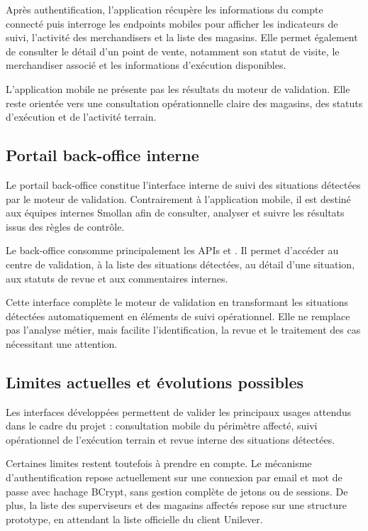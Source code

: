 Après authentification, l’application récupère les informations du compte connecté puis interroge les endpoints mobiles pour afficher les indicateurs de suivi, l’activité des merchandisers et la liste des magasins. Elle permet également de consulter le détail d’un point de vente, notamment son statut de visite, le merchandiser associé et les informations d’exécution disponibles.

L’application mobile ne présente pas les résultats du moteur de validation. Elle reste orientée vers une consultation opérationnelle claire des magasins, des statuts d’exécution et de l’activité terrain.

\subsection{Portail back-office interne}

Le portail back-office constitue l’interface interne de suivi des situations détectées par le moteur de validation. Contrairement à l’application mobile, il est destiné aux équipes internes Smollan afin de consulter, analyser et suivre les résultats issus des règles de contrôle.

Le back-office consomme principalement les APIs  et . Il permet d’accéder au centre de validation, à la liste des situations détectées, au détail d’une situation, aux statuts de revue et aux commentaires internes.

Cette interface complète le moteur de validation en transformant les situations détectées automatiquement en éléments de suivi opérationnel. Elle ne remplace pas l’analyse métier, mais facilite l’identification, la revue et le traitement des cas nécessitant une attention.

\subsection{Limites actuelles et évolutions possibles}

Les interfaces développées permettent de valider les principaux usages attendus dans le cadre du projet : consultation mobile du périmètre affecté, suivi opérationnel de l’exécution terrain et revue interne des situations détectées.

Certaines limites restent toutefois à prendre en compte. Le mécanisme d’authentification repose actuellement sur une connexion par email et mot de passe avec hachage BCrypt, sans gestion complète de jetons ou de sessions. De plus, la liste des superviseurs et des magasins affectés repose sur une structure prototype, en attendant la liste officielle du client Unilever.

